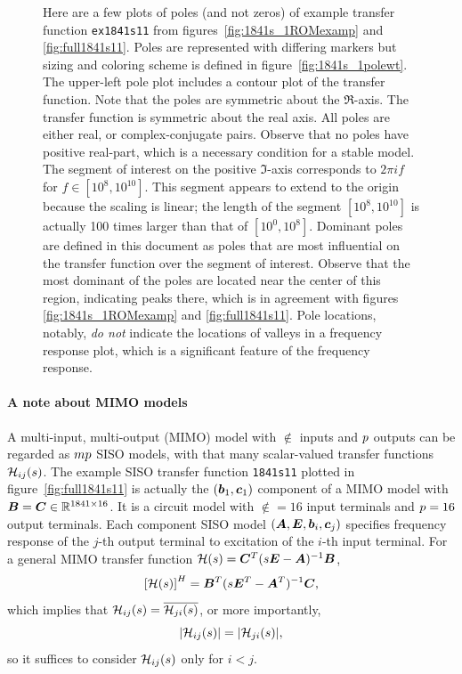 \begin{figure}[htbp]
\centering
{}
\caption{\label{fig:1841s_1_poles}Here are a few plots of poles (and not zeros) of example transfer function \texttt{ex1841s11} from figures~\ref{fig:1841s_1ROMexamp} and \ref{fig:full1841s11}.  Poles are represented with differing markers but sizing and coloring scheme is defined in figure~\ref{fig:1841s_1polewt}.  The upper-left pole plot includes a contour plot of the transfer function.  Note that the poles are symmetric about the $\Re$-axis.  The transfer function is symmetric about the real axis.  All poles are either real, or complex-conjugate pairs.   Observe that no poles  have positive real-part, which is a necessary condition for a stable model. The segment of interest on the positive $\Im$-axis corresponds to $2\pi i f$ for $f\in[10^{8},10^{10}]$.  This segment appears to extend to the origin because the scaling is linear; the length of the segment $[10^{8},10^{10}]$ is actually 100 times larger than that of $[10^{0}, 10^{8}]$.  Dominant poles are defined in this document as poles that are most influential on the transfer function over the segment of interest.  Observe that the most dominant of the poles are located near the center of this region, indicating peaks there, which is in agreement with figures \ref{fig:1841s_1ROMexamp} and \ref{fig:full1841s11}.  Pole locations, notably, \emph{do not} indicate the locations of valleys in a frequency response plot, which is a significant feature of the frequency response.}
\end{figure}

    
\paragraph{A note about MIMO models}
 A multi-input, multi-output (MIMO) model with $\nin$ inputs and $p$ outputs can be regarded as $m p$ SISO models, with that many scalar-valued transfer functions $ \mathcal{H}_{ij}(s)$.  The example SISO transfer function \texttt{1841s11} plotted in figure~\ref{fig:full1841s11} is actually the $(\bm{b}_1,\bm{c}_1)$ component of a MIMO model with $\bm{B}=\bm{C}\in\mathbb{R}^{1841 \times 16}$.  It is a circuit model with $\nin=16$ input terminals and $p=16$ output terminals.  Each component SISO model $(\bm{A},\bm{E},\bm{b}_i,\bm{c}_j)$ specifies frequency response of the $j$-th output terminal to excitation of the $i$-th input terminal.  For a general MIMO transfer function $\mathcal{H}(s)=\bm{C}^T (s\bm{E}-\bm{A})^{-1} \bm{B}$,
\[ 
\left[ \mathcal{H}(s) \right]^H = \bm{B}^T (s\bm{E}^T-\bm{A}^T)^{-1} \bm{C},
\]  
which implies that $\mathcal{H}_{ij}(s) = \overline{\mathcal{H}_{ji}(s)}$, or more importantly,
\[
| \mathcal{H}_{ij}(s) | = | \mathcal{H}_{ji}(s) |,
\]
so it suffices to consider $\mathcal{H}_{ij}(s)$ only for $i<j$.

